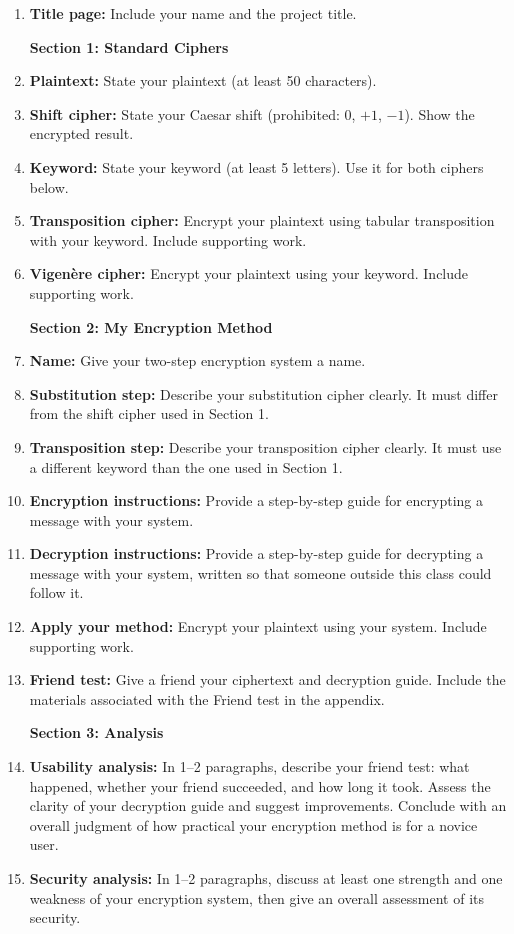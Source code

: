 \documentclass[11pt]{article}
\begin{document}
\begin{enumerate}[leftmargin=*, label=\(\square\)]
\item \textbf{Title page:} Include your name and the project title.

\hspace*{-.2in}\textbf{Section 1: Standard Ciphers}
\vspace{-3pt}
\item \textbf{Plaintext:} State your plaintext (at least 50 characters).
\item \textbf{Shift cipher:} State your Caesar shift (prohibited: $0$, $+1$, $-1$). Show the encrypted result.
\item \textbf{Keyword:} State your keyword (at least 5 letters). Use it for both ciphers below.
\item \textbf{Transposition cipher:} Encrypt your plaintext using tabular transposition with your keyword. Include supporting work.
\item \textbf{Vigen\`{e}re cipher:} Encrypt your plaintext using your keyword. Include supporting work.

\hspace*{-.2in}\textbf{Section 2: My Encryption Method}
\vspace{-3pt}
\item \textbf{Name:} Give your two-step encryption system a name.
\item \textbf{Substitution step:} Describe your substitution cipher clearly. It must differ from the shift cipher used in Section 1.
\item \textbf{Transposition step:} Describe your transposition cipher clearly. It must use a different keyword than the one used in Section 1.
\item \textbf{Encryption instructions:} Provide a step-by-step guide for encrypting a message with your system.
\item \textbf{Decryption instructions:} Provide a step-by-step guide for decrypting a message with your system, written so that someone outside this class could follow it.
\item \textbf{Apply your method:} Encrypt your plaintext using your system. Include supporting work.
\item \textbf{Friend test:} Give a friend your ciphertext and decryption guide.  Include the materials associated with the Friend test in the appendix.

\hspace*{-.2in}\textbf{Section 3: Analysis}
\vspace{-3pt}
\item \textbf{Usability analysis:} In 1--2 paragraphs, describe your friend test: what happened, whether your friend succeeded, and how long it took. Assess the clarity of your decryption guide and suggest improvements. Conclude with an overall judgment of how practical your encryption method is for a novice user.
\item \textbf{Security analysis:} In 1--2 paragraphs, discuss at least one strength and one weakness of your encryption system, then give an overall assessment of its security.


\end{enumerate}
\end{document}

